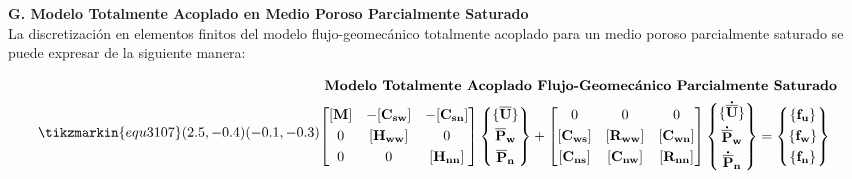 \newpage
\textbf{G. Modelo Totalmente Acoplado en Medio Poroso Parcialmente Saturado}\\
La discretización en elementos finitos del modelo flujo-geomecánico totalmente acoplado para un medio poroso parcialmente saturado se puede expresar de la siguiente manera:\bigskip

\begin{ceqn} %
\begin{subequations}\label{eq:equ3107}
\tikzmarkin{equ3107}(2.5,-0.4)(-0.1,-0.3)
\begin{gather}
\shortintertext{  \textbf{Modelo Totalmente Acoplado Flujo-Geomecánico Parcialmente Saturado}} 
\begin{bmatrix}
      [\mathbf{M}]  & -[\mathbf{C_{sw}}]   & -[\mathbf{C_{sn}}]\\[0.3em]
      0		        & [\mathbf{H_{ww}}]    & 0\\[0.3em]
      0		        & 0                    & [\mathbf{H_{nn}}]
\end{bmatrix}
\begin{Bmatrix}
      \{\mathbf{\overline{U}}\}    \\[0.3em]
      \mathbf{\overline{P}_w}      \\[0.3em]
      \mathbf{\overline{P}_n}
\end{Bmatrix}
+
\begin{bmatrix}
      0                  & 0                    & 0 \\[0.3em]
      [\mathbf{C_{ws}}]  & [\mathbf{R_{ww}}]    & [\mathbf{C_{wn}}] \\[0.3em]
      [\mathbf{C_{ns}}]  & [\mathbf{C_{nw}}]    & [\mathbf{R_{nn}}]
\end{bmatrix}
\begin{Bmatrix}
      \{\mathbf{\dot{\overline{U}}}\}    \\[0.3em]
      \mathbf{\dot{\overline{P}}_w}    \\[0.3em]
      \mathbf{\dot{\overline{P}}_n}
\end{Bmatrix}
= 
\begin{Bmatrix}
      \{\mathbf{f_u}\}    \\[0.3em]
      \{\mathbf{f_w}\}    \\[0.3em]
      \{\mathbf{f_n}\}
\end{Bmatrix} \label{eq:equ3107a}\\[12pt]

\end{gather}
\end{subequations}
\end{ceqn}
